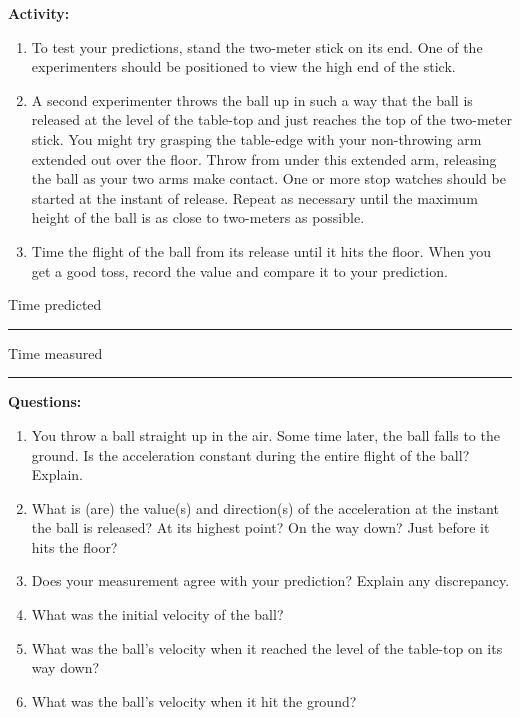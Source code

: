 {\noindent \bf Activity:} \begin{enumerate}

\item To test your predictions, stand the two-meter stick on its end. One of the experimenters should be positioned to view the high end of the stick.

\item A second experimenter throws the ball up in such a way that the ball is released at the level of the table-top and just reaches the top of the two-meter stick. You might try grasping the table-edge with your non-throwing arm extended out over the floor. Throw from under this extended arm, releasing the ball as your two arms make contact. One or more stop watches should be started at the instant of release. Repeat as necessary until the maximum height of the ball is as close to two-meters as possible.

\item Time the flight of the ball from its release until it hits the floor. When you get a good toss, record the value and compare it to your prediction.

\end{enumerate}

\bigskip

{\noindent Time predicted \rule{1.75in}{0.2pt} \hspace{10pt} Time measured \rule{1.75in}{0.2pt}}

\pagebreak

{\noindent \bf Questions:}

\begin{enumerate}
\item You throw a ball straight up in the air. Some time later, the ball falls to
the ground. Is the acceleration constant during the entire flight of the ball?
Explain.\vspace{20mm}

\item What is (are) the value(s) and direction(s) of the acceleration at the instant
the ball is released? At its highest point? On the way down? Just before it
hits the floor?\vspace{20mm}

\item Does your measurement agree with your prediction? Explain any discrepancy.\vspace{20mm}

\item What was the initial velocity of the ball?\vspace{20mm}

\item What was the ball's velocity when it reached the level of the table-top on its
way down?\vspace{20mm}

\item What was the ball's velocity when it hit the ground?
\end{enumerate}
